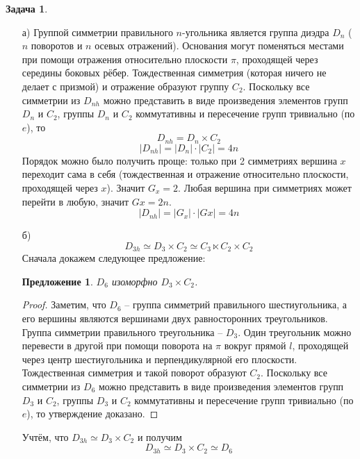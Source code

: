 \documentclass[12pt]{article}
\newtheorem{predl}[theorem]{Предложение}
\theoremstyle{definition}
\newtheorem{zad}{Задача}[section]
\begin{document}
\begin{zad}
\begin{itemize}
    \item[а)] Группой симметрии правильного $n$-угольника является группа диэдра $D_n$ ($n$ поворотов и $n$ осевых отражений). Основания могут поменяться местами при помощи отражения относительно плоскости $\pi$, проходящей через середины боковых рёбер. Тождественная симметрия (которая ничего не делает с призмой) и отражение образуют группу $C_2$. Поскольку все симметрии из $D_{nh}$ можно представить в виде произведения элементов групп $D_n$ и $C_2$, группы $D_n$ и $C_2$ коммутативны и пересечение групп тривиально (по $e$), то
    \begin{equation}
        D_{nh}=D_n\times C_2
    \end{equation}
    \begin{equation}
        \boxed{|D_{nh}|=|D_n|\cdot|C_2|=4n}
    \end{equation}
    Порядок можно было получить проще: только при 2 симметриях вершина $x$ переходит сама в себя (тождественная и отражение относительно плоскости, проходящей через $x$). Значит $G_x=2$. Любая вершина при симметриях может перейти в любую, значит $Gx=2n$.
    \begin{equation}
        \boxed{|D_{nh}|=|G_x|\cdot|Gx|=4n}
    \end{equation}
    \item[б)]
    \begin{equation}
        \boxed{D_{3h}\simeq D_3\times C_2\simeq C_3\ltimes C_2\times C_2}
    \end{equation}
    Сначала докажем следующее предложение:
    \begin{predl}
        $D_6$ изоморфно $D_3\times C_2$.
    \end{predl}
    \begin{proof}
        Заметим, что $D_6$ -- группа симметрий правильного шестиугольника, а его вершины являются вершинами двух равносторонних треугольников. Группа симметрии правильного треугольника -- $D_3$. Один треугольник можно перевести в другой при помощи поворота на $\pi$ вокруг прямой $l$, проходящей через центр шестиугольника и перпендикулярной его плоскости. Тождественная симметрия и такой поворот образуют $C_2$. Поскольку все симметрии из $D_6$ можно представить в виде произведения элементов групп $D_3$ и $C_2$, группы $D_3$ и $C_2$ коммутативны и пересечение групп тривиально (по $e$), то утверждение доказано.
    \end{proof}
    Учтём, что $D_{3h}\simeq D_3\times C_2$ и получим
    \begin{equation}
        \boxed{D_{3h}\simeq D_3\times C_2\simeq D_6}
    \end{equation}
\end{itemize}
\end{zad}
\end{document}
